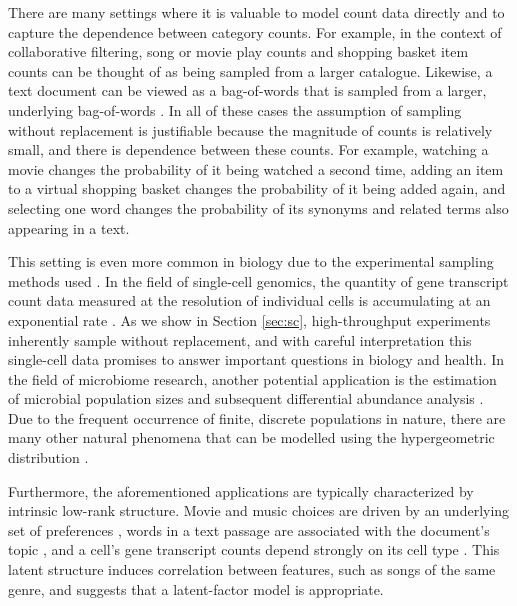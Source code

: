 \documentclass{article}
\theoremstyle{plain}
\theoremstyle{definition}
\theoremstyle{remark}
\begin{document}
There are many settings where it is valuable to model count data directly and to capture the dependence between category counts. For example, in the context of collaborative filtering, song or movie play counts \cite{van2013deep} and shopping basket item counts \cite{faggioli2020recency} can be thought of as being sampled from a larger catalogue. Likewise, a text document can be viewed as a bag-of-words that is sampled from a larger, underlying bag-of-words \cite{goldberg2022neural}. In all of these cases the assumption of sampling without replacement is justifiable because the magnitude of counts is relatively small, and there is dependence between these counts. For example, watching a movie changes the probability of it being watched a second time, adding an item to a virtual shopping basket changes the probability of it being added again, and selecting one word changes the probability of its synonyms and related terms also appearing in a text.

This setting is even more common in biology due to the experimental sampling methods used \cite{depatta1998sampling}. In the field of single-cell genomics, the quantity of gene transcript count data measured at the resolution of individual cells is accumulating at an exponential rate \cite{svensson2018exponential}. As we show in Section \ref{sec:sc}, high-throughput experiments inherently sample without replacement, and with careful interpretation this single-cell data promises to answer important questions in biology and health. In the field of microbiome research, another potential application is the estimation of microbial population sizes and subsequent differential abundance analysis \citep{morton2019learning,morton2019establishing}. Due to the frequent occurrence of finite, discrete populations in nature, there are many other natural phenomena that can be modelled using the hypergeometric distribution \cite{holmes2018modern}.

Furthermore, the aforementioned applications are typically characterized by intrinsic low-rank structure. Movie and music choices are driven by an underlying set of preferences \cite{feuerverger2012statistical}, words in a text passage are associated with the document's topic \cite{vayansky2020review}, and a cell’s gene transcript counts depend strongly on its cell type \cite{gronbech2020scvae}. This latent structure induces correlation between features, such as songs of the same genre, and suggests that a latent-factor model is appropriate.
\end{document}
